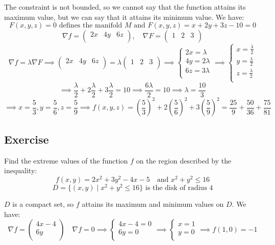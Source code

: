 \documentclass[11pt]{article}
\begin{document}
The constraint is not bounded, so we cannot say that the function attains its maximum value, but we can say that it attains its minimum value. We have:
\[
F(x,y,z) = 0 \text{ defines the manifold } M \text{ and } F(x,y,z) = x + 2y + 3z - 10 = 0
\]
\[
\nabla f = \begin{pmatrix}
    2x & 4y & 6z \\
\end{pmatrix}, \quad \nabla F = \begin{pmatrix}
    1 & 2 & 3 \\
\end{pmatrix}
\]
\[
\nabla f = \lambda \nabla F \implies \begin{pmatrix}
    2x & 4y & 6z \\
\end{pmatrix} = \lambda \begin{pmatrix}
        1 & 2 & 3 \\
    \end{pmatrix} \implies \begin{cases}
        2x = \lambda \\
        4y = 2\lambda \\
        6z = 3\lambda \\
    \end{cases} \implies \begin{cases}
        x = \frac{\lambda}{2} \\
        y = \frac{\lambda}{2} \\
        z = \frac{\lambda}{2} \\
    \end{cases}
\]
\[
\implies \frac{\lambda}{2} + 2\frac{\lambda}{2} + 3\frac{\lambda}{2} = 10 \implies \frac{6\lambda}{2} = 10 \implies \lambda = \frac{10}{3}
\]
\[
\implies x = \frac{5}{3}, y = \frac{5}{6}, z = \frac{5}{9} \implies f(x,y,z) = \left(\frac{5}{3}\right)^2 + 2\left(\frac{5}{6}\right)^2 + 3\left(\frac{5}{9}\right)^2 = \frac{25}{9} + \frac{50}{36} + \frac{75}{81} 
\]

\subsection*{Exercise}
Find the extreme values of the function $f$ on the region described by the inequality:
\[
f(x,y) = 2x^2 + 3y^2 - 4x - 5 \quad \text{and } x^2 + y^2 \leq 16
\]
\[
D = \{ (x,y) \mid x^2 + y^2 \leq 16 \} \text{ is the disk of radius } 4
\]

$D$ is a compact set, so $f$ attains its maximum and minimum values on $D$. We have:
\[
\nabla f = \begin{pmatrix}
    4x - 4 \\
    6y \\
\end{pmatrix} \quad \nabla f = 0 \implies \begin{cases}
    4x - 4 = 0 \\
    6y = 0 \\
\end{cases} \implies \begin{cases}
    x = 1 \\
    y = 0 \\
\end{cases} \implies f(1,0) = -1
\]
\end{document}
